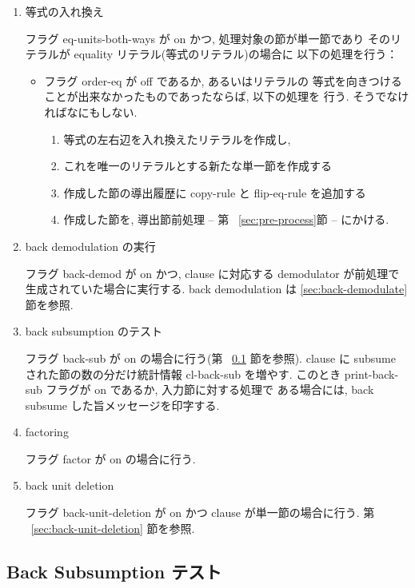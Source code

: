 \begin{enumerate}
\item 等式の入れ換え

  フラグ eq-units-both-ways が on かつ, 処理対象の節が単一節であり
  そのリテラルが equality リテラル(等式のリテラル)の場合に
  以下の処理を行う：
  \begin{itemize}
  \item フラグ order-eq が off であるか, あるいはリテラルの
    等式を向きつけることが出来なかったものであったならば, 以下の処理を
    行う. そうでなければなにもしない.
    \begin{enumerate}
    \item 等式の左右辺を入れ換えたリテラルを作成し,
    \item これを唯一のリテラルとする新たな単一節を作成する
    \item 作成した節の導出履歴に copy-rule と flip-eq-rule を追加する
    \item 作成した節を, 導出節前処理 -- 第 ~\ref{sec:pre-process}節 -- 
      にかける. 
    \end{enumerate}
  \end{itemize}

\item back demodulation の実行

  フラグ back-demod が on かつ, clause に対応する demodulator
  が前処理で生成されていた場合に実行する.
  back demodulation は \ref{sec:back-demodulate} 節を参照.

\item back subsumption のテスト

  フラグ back-sub が on の場合に行う(第 ~\ref{sec:back-subsume} 節を参照).
  clause に subsume された節の数の分だけ統計情報 cl-back-sub を増やす.
  このとき print-back-sub フラグが on であるか, 入力節に対する処理で
  ある場合には, back subsume した旨メッセージを印字する.

\item factoring

  フラグ factor が on の場合に行う.
    
\item back unit deletion 
    
  フラグ back-unit-deletion が on かつ clause が単一節の場合に行う.
  第 ~\ref{sec:back-unit-deletion} 節を参照.
\end{enumerate}


\subsection{Back Subsumption テスト}
\label{sec:back-subsume}

